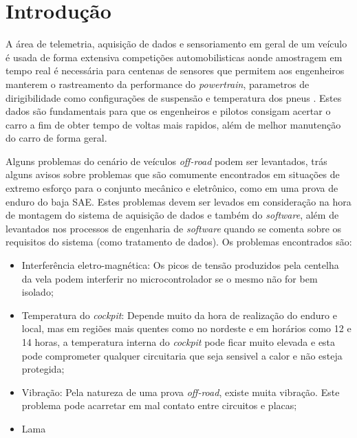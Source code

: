 \chapter{Introdução} 
	\label{ch:introducao}

A área de telemetria, aquisição de dados e sensoriamento em geral de um veículo é usada de forma extensiva competições automobilisticas aonde amostragem em tempo real é necessária para centenas de sensores que permitem aos engenheiros manterem o rastreamento da performance do \textit{powertrain}, parametros de dirigibilidade como configurações de suspensão e temperatura dos pneus \cite{designAndImplementation2015}. Estes dados são fundamentais para que os engenheiros e pilotos consigam acertar o carro a fim de obter tempo de voltas mais rapidos, além de melhor manutenção do carro de forma geral.

Alguns problemas do cenário de veículos \textit{off-road} podem ser levantados, \cite{projetoMiniBaja2006} trás alguns avisos sobre problemas que são comumente encontrados em situações de extremo esforço para o conjunto mecânico e eletrônico, como em uma prova de enduro do baja SAE. Estes problemas devem ser levados em consideração na hora de montagem do sistema de aquisição de dados e também do \textit{software}, além de levantados nos processos de engenharia de \textit{software} quando se comenta sobre os requisitos do sistema (como tratamento de dados). Os problemas encontrados são:

\begin{itemize}
	\item  Interferência eletro-magnética: Os picos de tensão produzidos pela centelha da vela podem interferir no microcontrolador se o mesmo não for bem isolado; 
	\item Temperatura do \textit{cockpit}: Depende muito da hora de realização do enduro e local, mas em regiões mais quentes como no nordeste e em horários como 12 e 14 horas, a temperatura interna do \textit{cockpit} pode ficar muito elevada e esta pode comprometer qualquer circuitaria que seja sensivel a calor e não esteja protegida; 
	\item Vibração: Pela natureza de uma prova \textit{off-road}, existe muita vibração. Este problema pode acarretar em mal contato entre circuitos e placas;
	\item Lama
\end{itemize}


